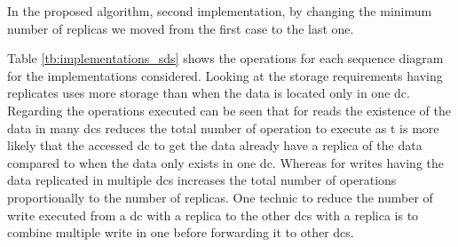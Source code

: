 \documentclass[english]{article}
\begin{document}
In the proposed algorithm, second implementation, by changing the minimum number of replicas we moved from the first case to the last one.

Table \ref{tb:implementations_sds} shows the operations for each sequence diagram for the implementations considered. Looking at the storage requirements having replicates uses more storage than when the data is located only in one \gls{dc}. Regarding the operations executed can be seen that for reads the existence of the data in many \glspl{dc} reduces the total number of operation to execute as t is more likely that the accessed \gls{dc} to get the data already have a replica of the data compared to when the data only exists in one \gls{dc}. Whereas for writes having the data replicated in multiple \glspl{dc} increases the total number of operations proportionally to the number of replicas. One technic to reduce the number of write executed from a \gls{dc} with a replica to the other \glspl{dc} with a replica is to combine multiple write in one before forwarding it to other \glspl{dc}.
\end{document}
